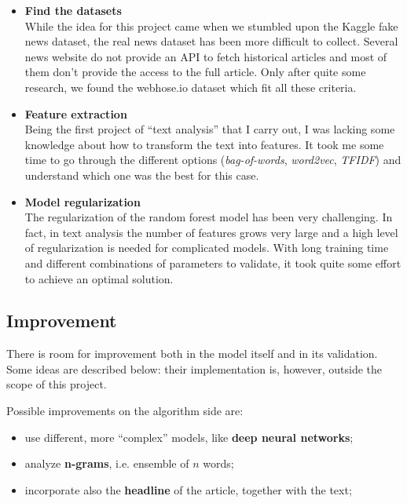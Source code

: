 \documentclass[a4paper,12pt]{article} %
\begin{document}
\begin{itemize}
\item \textbf{Find the datasets} \\
    While the idea for this project came when we stumbled upon the Kaggle fake news dataset,
    the real news dataset has been more difficult to collect.
    Several news website do not provide an API to fetch historical articles and most
    of them don't provide the access to the full article.
    Only after quite some research, we found the webhose.io dataset which fit all these criteria.
\item \textbf{Feature extraction} \\
    Being the first project of ``text analysis'' that I carry out,
    I was lacking some knowledge about how to transform the text into features.
    It took me some time to go through the different options (\textit{bag-of-words},
    \textit{word2vec}, \textit{TFIDF}) and understand which one was the best for this case.
\item \textbf{Model regularization} \\
    The regularization of the random forest model has been very challenging.
    In fact, in text analysis the number of features grows very large and a high
    level of regularization is needed for complicated models.
    With long training time and different combinations of parameters to validate,
    it took quite some effort to achieve an optimal solution.

\end{itemize}

\subsection{Improvement}
\label{sec:improvement}
There is room for improvement both in the model itself and in its validation.
Some ideas are described below: their implementation is, however, outside
the scope of this project.

Possible improvements on the algorithm side are:
\begin{itemize}
    \item use different, more ``complex'' models, like \textbf{deep neural networks};
    \item analyze \textbf{n-grams}, i.e. ensemble of $n$ words;
    \item incorporate also the \textbf{headline} of the article, together with the text;
\end{itemize}
\end{document}
